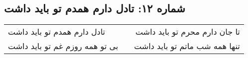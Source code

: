 \begin{center}
\section*{شماره ۱۲: تادل دارم همدم تو باید داشت}
\label{sec:012}
\begin{longtable}{l p{0.5cm} r}
تادل دارم همدم تو باید داشت
&&
تا جان دارم محرم تو باید داشت
\\
بی تو همه روزم غم تو باید داشت
&&
تنها همه شب ماتم تو باید داشت
\\
\end{longtable}
\end{center}
